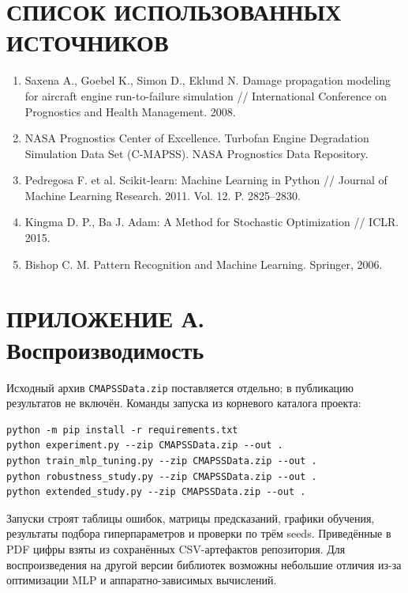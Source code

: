 \documentclass[12pt,a4paper]{article}
\begin{document}
\section*{СПИСОК ИСПОЛЬЗОВАННЫХ ИСТОЧНИКОВ}
\begin{enumerate}[leftmargin=1.3cm]
\item Saxena A., Goebel K., Simon D., Eklund N. Damage propagation modeling for aircraft engine run-to-failure simulation // International Conference on Prognostics and Health Management. 2008.
\item NASA Prognostics Center of Excellence. Turbofan Engine Degradation Simulation Data Set (C-MAPSS). NASA Prognostics Data Repository.
\item Pedregosa F. et al. Scikit-learn: Machine Learning in Python // Journal of Machine Learning Research. 2011. Vol. 12. P. 2825--2830.
\item Kingma D. P., Ba J. Adam: A Method for Stochastic Optimization // ICLR. 2015.
\item Bishop C. M. Pattern Recognition and Machine Learning. Springer, 2006.
\end{enumerate}
\section*{ПРИЛОЖЕНИЕ А. Воспроизводимость}
Исходный архив \texttt{CMAPSSData.zip} поставляется отдельно; в публикацию результатов не включён. Команды запуска из корневого каталога проекта:
\begin{verbatim}
python -m pip install -r requirements.txt
python experiment.py --zip CMAPSSData.zip --out .
python train_mlp_tuning.py --zip CMAPSSData.zip --out .
python robustness_study.py --zip CMAPSSData.zip --out .
python extended_study.py --zip CMAPSSData.zip --out .
\end{verbatim}
Запуски строят таблицы ошибок, матрицы предсказаний, графики обучения, результаты подбора гиперпараметров и проверки по трём seeds. Приведённые в PDF цифры взяты из сохранённых CSV-артефактов репозитория. Для воспроизведения на другой версии библиотек возможны небольшие отличия из-за оптимизации MLP и аппаратно-зависимых вычислений.
\end{document}
